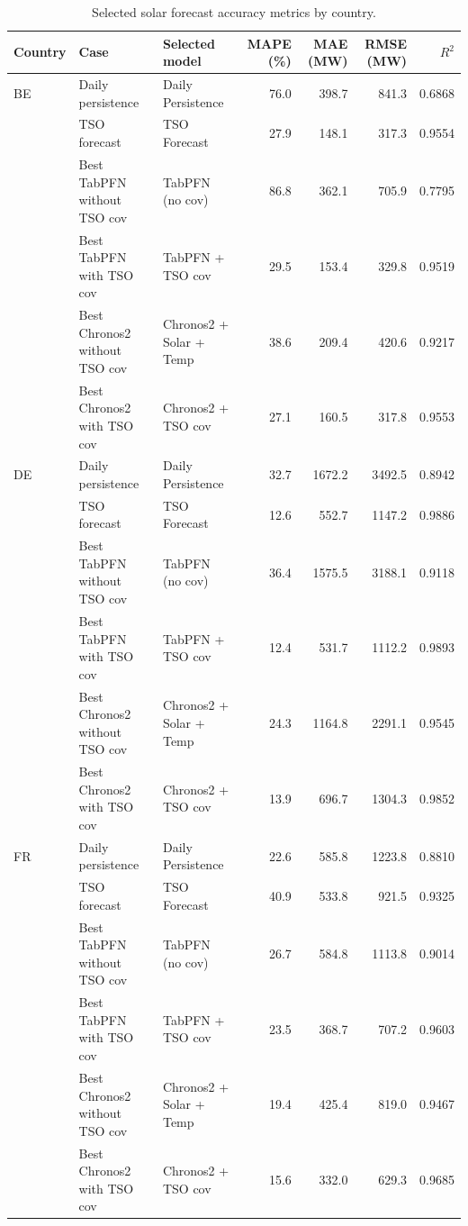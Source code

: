 \begin{table}[htbp]
\centering
\caption{Selected solar forecast accuracy metrics by country.}
\label{tab:solar_selected_accuracy_metrics}
\small
\begin{tabular}{lllrrrr}
\toprule
Country & Case & Selected model & MAPE (\%) & MAE (MW) & RMSE (MW) & $R^2$ \\
\midrule
BE & Daily persistence & Daily Persistence & 76.0 & 398.7 & 841.3 & 0.6868 \\
 & TSO forecast & TSO Forecast & 27.9 & 148.1 & 317.3 & 0.9554 \\
 & Best TabPFN without TSO cov & TabPFN (no cov) & 86.8 & 362.1 & 705.9 & 0.7795 \\
 & Best TabPFN with TSO cov & TabPFN + TSO cov & 29.5 & 153.4 & 329.8 & 0.9519 \\
 & Best Chronos2 without TSO cov & Chronos2 + Solar + Temp & 38.6 & 209.4 & 420.6 & 0.9217 \\
 & Best Chronos2 with TSO cov & Chronos2 + TSO cov & 27.1 & 160.5 & 317.8 & 0.9553 \\
\midrule
DE & Daily persistence & Daily Persistence & 32.7 & 1672.2 & 3492.5 & 0.8942 \\
 & TSO forecast & TSO Forecast & 12.6 & 552.7 & 1147.2 & 0.9886 \\
 & Best TabPFN without TSO cov & TabPFN (no cov) & 36.4 & 1575.5 & 3188.1 & 0.9118 \\
 & Best TabPFN with TSO cov & TabPFN + TSO cov & 12.4 & 531.7 & 1112.2 & 0.9893 \\
 & Best Chronos2 without TSO cov & Chronos2 + Solar + Temp & 24.3 & 1164.8 & 2291.1 & 0.9545 \\
 & Best Chronos2 with TSO cov & Chronos2 + TSO cov & 13.9 & 696.7 & 1304.3 & 0.9852 \\
\midrule
FR & Daily persistence & Daily Persistence & 22.6 & 585.8 & 1223.8 & 0.8810 \\
 & TSO forecast & TSO Forecast & 40.9 & 533.8 & 921.5 & 0.9325 \\
 & Best TabPFN without TSO cov & TabPFN (no cov) & 26.7 & 584.8 & 1113.8 & 0.9014 \\
 & Best TabPFN with TSO cov & TabPFN + TSO cov & 23.5 & 368.7 & 707.2 & 0.9603 \\
 & Best Chronos2 without TSO cov & Chronos2 + Solar + Temp & 19.4 & 425.4 & 819.0 & 0.9467 \\
 & Best Chronos2 with TSO cov & Chronos2 + TSO cov & 15.6 & 332.0 & 629.3 & 0.9685 \\
\bottomrule
\end{tabular}
\end{table}